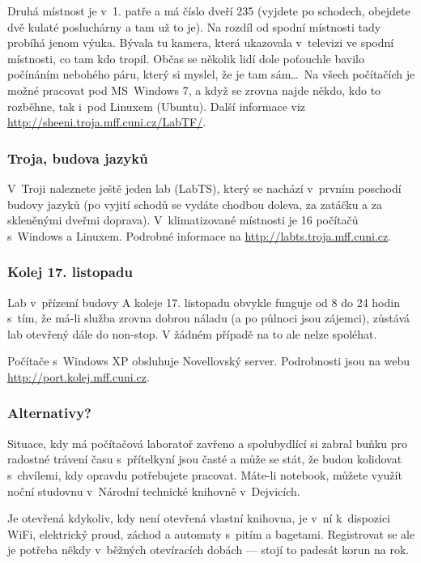Druhá místnost je v~1. patře a má číslo dveří 235 (vyjdete po
schodech, obejdete dvě kulaté posluchárny a tam už to je).  Na rozdíl od spodní místnosti tady probíhá jenom výuka. Bývala tu kamera, která ukazovala v~televizi ve spodní místnosti, co tam kdo tropil.
Občas se několik lidí dole
poťouchle bavilo počínáním nebohého páru, který si myslel, že je
tam sám\dots\ Na všech počítačích je možné pracovat pod
MS~Windows 7, a když se zrovna najde někdo, kdo to rozběhne, tak
i~pod Linuxem (Ubuntu). Další informace viz \url{http://sheeni.troja.mff.cuni.cz/LabTF/}.


\subsubsection{Troja, budova jazyků}

V~Troji naleznete ještě jeden lab (LabTS), který se nachází
v~prvním poschodí budovy jazyků (po vyjití schodů se vydáte chodbou
doleva, za zatáčku a za skleněnými dveřmi doprava).
V~klimatizované místnosti je 16 počítačů s~Windows a Linuxem.
Podrobné informace na \url{http://labts.troja.mff.cuni.cz}.

\subsubsection{Kolej 17. listopadu}

Lab v~přízemí budovy A koleje 17. listopadu obvykle funguje od 8 do 24 hodin s~tím, že má-li služba zrovna dobrou náladu (a po půlnoci jsou zájemci), zůstává lab otevřený dále do non-stop. V žádném případě na to ale nelze spoléhat.

Počítače s~Windows XP obsluhuje Novellovský server. Podrobnosti jsou na webu \url{http://port.kolej.mff.cuni.cz}.

\subsubsection{Alternativy?}

Situace, kdy má počítačová laboratoř zavřeno a spolubydlící si zabral buňku pro radostné trávení času s~přítelkyní jsou časté a může se stát, že budou kolidovat s~chvílemi, kdy opravdu potřebujete pracovat. Máte-li notebook, můžete využít noční studovnu v~Národní technické knihovně v~Dejvicích.

Je otevřená kdykoliv, kdy není otevřená vlastní knihovna, je v~ní k~dispozici WiFi, elektrický proud, záchod a automaty s~pitím a bagetami. Registrovat se ale je potřeba někdy v~běžných otevíracích dobách --- stojí to padesát korun na rok.